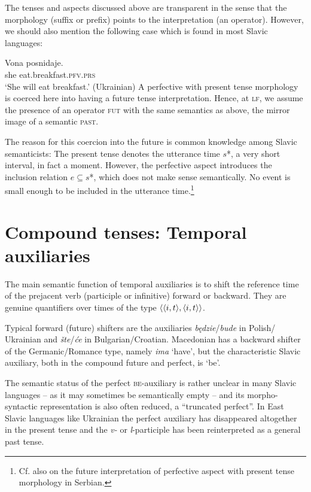 \documentclass[output=paper,colorlinks,citecolor=brown]{langscibook}
\begin{document}
The tenses and aspects discussed above are transparent in the sense that the morphology (suffix or prefix) points to the interpretation (an operator). However, we should also mention the following case which is found in most Slavic languages:

\ea\label{ukr3}\gll Vona posnidaje.\\
she eat.breakfast.\textsc{pfv}.\textsc{prs} \\
\glt `She will eat breakfast.' \hfill (Ukrainian)
\z
A perfective with present tense morphology is coerced here into having a future tense
interpretation. Hence, at \textsc{lf}, we assume the presence of an operator \textsc{fut} with the same semantics as   above,  the mirror image of a semantic \textsc{past}. 

The reason for this coercion into the future is common knowledge among Slavic semanticists: The present tense denotes the utterance time $s$*, a very short interval, in fact a moment. However, the perfective aspect introduces the inclusion relation $e \subseteq s$*, which does not make sense semantically. No event is small enough to be included in the utterance time.\footnote{Cf. also \citet{todorovic15} on the future interpretation of perfective aspect with present tense morphology in Serbian.} 
 

\section{Compound tenses: Temporal auxiliaries}\label{sec:3}

The main semantic function of temporal auxiliaries is to shift the reference time of the prejacent verb (participle or infinitive) forward or backward. They are genuine quantifiers over times of the type $\langle{\langle{i,t}\rangle,\langle{i,t}\rangle}\rangle$.

Typical forward (future) shifters are the auxiliaries {\textit{b{ę}dzie}}/\textit{bude} in Polish/ Ukra\-inian and \textit{šte}/\textit{će} in Bulgarian/Croatian. 
Macedonian has a backward shifter of the Germanic/Romance type, namely {\textit{ima}} `have', but the characteristic Slavic auxiliary, both in the compound future and perfect, is `be'.

The semantic status of the perfect {\textsc{be}}-auxiliary is rather unclear in many Slavic languages -- as it may sometimes be semantically empty -- and its morpho-syn\-tac\-tic representation is also often reduced, a ``truncated perfect''. In East Slavic languages like Ukrainian the perfect auxiliary has disappeared altogether in the present tense and the {\textit{v-}} or {\textit{l}}-participle has been reinterpreted as a general past tense.
 
\end{document}
